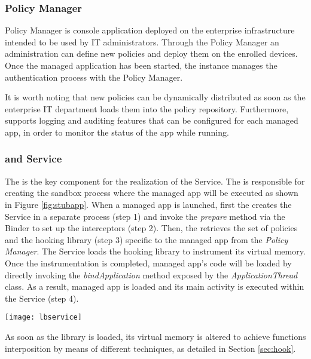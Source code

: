 \subsubsection{\asd Policy Manager}
\label{sec:polman}
\asd Policy Manager is console application deployed on the enterprise infrastructure intended to be used by IT administrators. Through the \asd Policy Manager an administration can define new policies and deploy them on the enrolled devices. Once the managed application has been started, the \asd instance manages the authentication process with the Policy Manager. 

It is worth noting that new policies can be dynamically distributed as soon as the enterprise IT department loads them into the policy repository. Furthermore, \asd supports logging and auditing features  that can be configured for each managed app, in order to monitor the status of the app while running.

\subsubsection{\stub and \asd Service} \label{sec:stub}
The \stub is the key component for the realization of the \asd Service. The \stub is responsible for creating the sandbox process where the managed app will be executed as shown in Figure \ref{fig:stubapp}. When a managed app is launched, first the \stub creates the  \asd Service in a separate process (step 1) and invoke the \textit{prepare} method via the Binder to set up the interceptors (step 2). Then, the \stub retrieves the set of policies and the hooking library (step 3) specific to the managed app from the \textit{\asd Policy Manager}. The \asd Service loads the hooking library to  instrument its virtual memory. Once the instrumentation is completed, managed app's code will be loaded by directly invoking the \textit{bindApplication} method exposed by the \textit{ApplicationThread} class. As a result, managed app is loaded and its main activity is executed within the \asd Service (step 4). 


\begin{figure*}
\centering
\texttt{[image: lbservice]}
\caption{\asd enforcing managed apps}
\label{fig:stubapp}
\end{figure*}

As soon as the library is loaded, its virtual memory is altered to achieve functions interposition by means of different techniques, as detailed in Section \ref{sec:hook}. 

